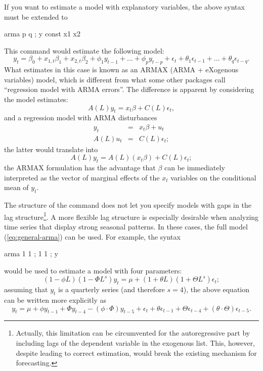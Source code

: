 If you want to estimate a model with explanatory variables, the above
syntax must be extended to
\begin{code}
  arma p q ; y const x1 x2
\end{code}
This command would estimate the following model:
\[
  y_t = \beta_0 + x_{1,t} \beta_1 + x_{2,t} \beta_2 + 
  \phi_1 y_{t-1} + \ldots + \phi_p y_{t-p} + 
  \epsilon_t + \theta_1 \epsilon_{t-1} + \ldots + \theta_q \epsilon_{t-q} .
\]
What  estimates in this case is known as an ARMAX (ARMA +
eXogenous variables) model, which is different from what some other packages
call ``regression model with ARMA errors''. The difference is apparent
by considering the model  estimates:
\begin{equation}
  \label{eq:armax}
  A(L) y_t = x_t \beta + C(L) \epsilon_t ,
\end{equation}
and a regression model with ARMA disturbances
\begin{eqnarray}
  \label{eq:reg-arma}
  y_t & = & x_t \beta + u_t \\
  A(L) u_t & = & C(L) \epsilon_t ;
\end{eqnarray}
the latter would translate into
\[
  A(L) y_t = A(L) \left(x_t \beta \right) + C(L) \epsilon_t ;
\]
the ARMAX formulation has the advantage that $\beta$ can be
immediately interpreted as the vector of marginal effects of the $x_t$
variables on the conditional mean of $y_t$.

The structure of the  command does not let you specify
models with gaps in the lag structure\footnote{Actually, this
  limitation can be circumvented for the autoregressive part by
  including lags of the dependent variable in the exogenous list.
  This, however, despite leading to correct estimation, would break
  the existing mechanism for forecasting.}. A more flexible lag
structure is especially desirable when analyzing time series that
display strong seasonal patterns. In these cases, the full model
(\ref{eq:general-arma}) can be used. For example, the syntax
\begin{code}
  arma 1 1 ; 1 1 ; y
\end{code}
would be used to estimate a model with four parameters:
\[
  ( 1 - \phi L )  ( 1 - \Phi L^s ) y_t = \mu + ( 1 + \theta L ) ( 1 + \Theta L^s ) \epsilon_t;
\]
assuming that $y_t$ is a quarterly series (and therefore $s=4$), the
above equation can be written more explicitly as
\[
  y_t = \mu + \phi y_{t-1} + \Phi y_{t-4} - (\phi \cdot \Phi) y_{t-5} + 
  \epsilon_t + \theta \epsilon_{t-1} + \Theta \epsilon_{t-4} +
  (\theta \cdot \Theta) \epsilon_{t-5} .
\]

